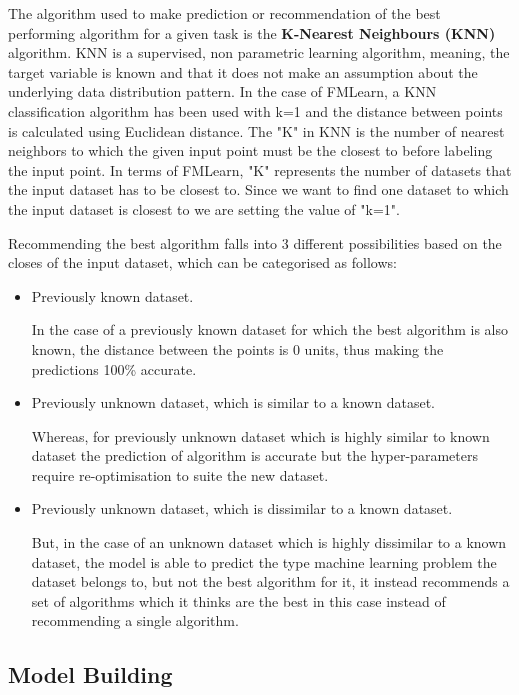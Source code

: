 The algorithm used to make prediction or recommendation of the best performing algorithm for a given task is the \textbf{K-Nearest Neighbours (KNN)} algorithm. KNN is a supervised, non parametric learning algorithm, meaning, the target variable is known and that it does not make an assumption about the underlying data distribution pattern. In the case of FMLearn, a KNN classification algorithm has been used with k=1 and the distance between points is calculated using Euclidean distance. The "K" in KNN is the number of nearest neighbors to which the given input point must be the closest to before labeling the input point. In terms of FMLearn, "K" represents the number of datasets that the input dataset has to be closest to. Since we want to find one dataset to which the input dataset is closest to we are setting the value of "k=1". 

Recommending the best algorithm falls into 3 different possibilities based on the closes of the input dataset, which can be categorised as follows:
\begin{itemize}
    \item Previously known dataset.
    
    In the case of a previously known dataset for which the best algorithm is also known, the distance between the points is 0 units, thus making the predictions 100\% accurate.
    
    \item Previously unknown dataset, which is similar to a known dataset.
    
    Whereas, for previously unknown dataset which is highly similar to known dataset the prediction of algorithm is accurate but the hyper-parameters require re-optimisation to suite the new dataset.
    
    \item Previously unknown dataset, which is dissimilar to a known dataset.
    
    But, in the case of an unknown dataset which is highly dissimilar to a known dataset, the model is able to predict the type machine learning problem the dataset belongs to, but not the best algorithm for it, it instead recommends a set of algorithms which it thinks are the best in this case instead of recommending a single algorithm.
    
\end{itemize}

   

\subsection{Model Building}
\label{model-building}


